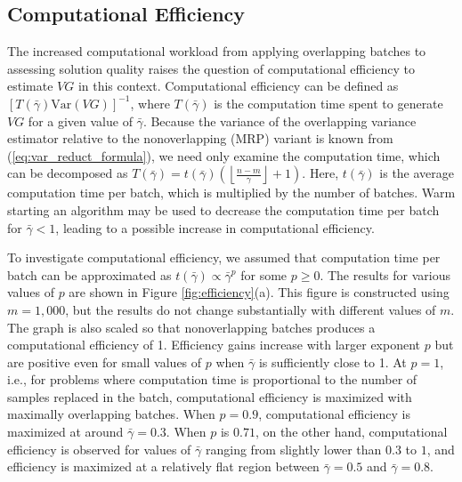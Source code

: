 \documentclass[12pt]{article}
\newcommand{\var}[1]{\mathrm{Var} \left( #1 \right)}
\newcommand{\nb}{\left\lfloor\tfrac{n-m}{\gamma}\right\rfloor+1}
\newcommand{\gammab}{\bar{\gamma}}
\begin{document}
\subsection{Computational Efficiency}
\label{ssec:compeff}


The increased computational workload from applying overlapping batches to assessing solution quality raises the question of computational efficiency to estimate $VG$ in this context.
Computational efficiency can be defined as $[T(\gammab)\var{VG}]^{-1}$, where $T(\gammab)$ is the computation time spent to generate $VG$ for a given value of $\gammab$.
Because the variance of the overlapping variance estimator relative to the nonoverlapping (MRP) variant is known from (\ref{eq:var_reduct_formula}), we need only examine the computation time, which can be decomposed as $T(\gammab) = t(\gammab)\left(\nb\right)$. 
Here, $t(\gammab)$ is the average computation time per batch, which is multiplied by the number of batches.
Warm starting an algorithm may be used to decrease the computation time per batch for $\gammab < 1$, leading to a possible increase in computational efficiency. 

To investigate computational efficiency, we assumed that computation time per batch can be approximated as $t(\gammab) \propto \gammab^p$ for some $p \geq 0$.
The results for various values of $p$ are shown in Figure \ref{fig:efficiency}(a). 
This figure is constructed using $m = 1,000$, but the results do not change substantially with different values of $m$.
The graph is also scaled so that nonoverlapping batches produces a computational efficiency of 1. 
Efficiency gains increase with larger exponent $p$ but are positive even for small values of $p$ when $\gammab$ is sufficiently close to 1.
At $p=1$, i.e., for problems where computation time is proportional to the number of samples replaced in the batch, computational efficiency is maximized with maximally overlapping batches.
When $p=0.9$, computational efficiency is maximized at around $\gammab=0.3$.
When $p$ is $0.71$, on the other hand, computational efficiency is observed for values of $\gammab$ ranging from slightly lower than $0.3$ to $1$, and efficiency is maximized at a relatively flat region between $\gammab=0.5$ and $\gammab=0.8$.
\end{document}
